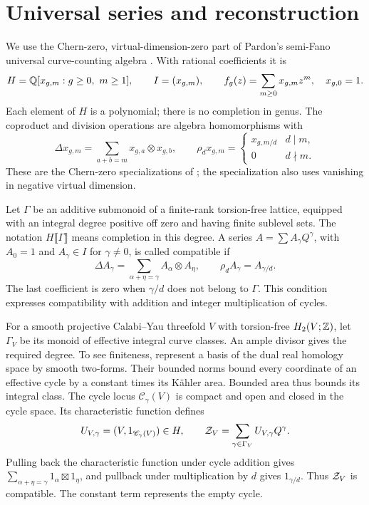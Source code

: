 \section{Universal series and reconstruction}\label{sec:universal}

We use the Chern-zero, virtual-dimension-zero part of Pardon's
semi-Fano universal curve-counting algebra \cite[Theorem 1.2]{Pardon}.
With rational coefficients it is
\[
 H=\mathbb Q[x_{g,m}:g\ge0,\ m\ge1],\qquad
 I=(x_{g,m}),\qquad f_g(z)=\sum_{m\ge0}x_{g,m}z^m,
 \quad x_{g,0}=1.
\]
Each element of $H$ is a polynomial; there is no completion in genus.
The coproduct and division operations are algebra homomorphisms with
\begin{equation}\label{eq:operations}
 \Delta x_{g,m}=\sum_{a+b=m}x_{g,a}\otimes x_{g,b},\qquad
 \rho_d x_{g,m}=\begin{cases}x_{g,m/d}&d\mid m,\\0&d\nmid m.
 \end{cases}
\end{equation}
These are the Chern-zero specializations of
\cite[Definitions 3.9, 3.12, Lemmas 4.12--4.13 and Theorem 7.6]{Pardon};
the specialization also uses vanishing in negative virtual dimension.

Let $\Gamma$ be an additive submonoid of a finite-rank torsion-free
lattice, equipped with an integral degree positive off zero and having
finite sublevel sets. The notation $H\llbracket\Gamma\rrbracket$ means
completion in this degree. A series $A=\sum A_\gamma Q^\gamma$, with
$A_0=1$ and $A_\gamma\in I$ for $\gamma\ne0$, is called compatible if
\begin{equation}\label{eq:compatible}
 \Delta A_\gamma=\sum_{\alpha+\eta=\gamma}A_\alpha\otimes A_\eta,
 \qquad \rho_d A_\gamma=A_{\gamma/d}.
\end{equation}
The last coefficient is zero when $\gamma/d$ does not belong to
$\Gamma$. This condition expresses compatibility with addition and
integer multiplication of cycles.

For a smooth projective Calabi--Yau threefold $V$ with torsion-free
$H_2(V;\mathbb Z)$, let $\Gamma_V$ be its monoid of effective integral curve
classes. An ample divisor gives the required degree. To see finiteness,
represent a basis of the dual real homology space by smooth two-forms.
Their bounded norms bound every coordinate of an effective cycle by a
constant times its K\"ahler area. Bounded area thus bounds its integral
class. The cycle locus $\mathscr C_\gamma(V)$ is compact and open and
closed in the cycle space. Its characteristic function defines
\[
 U_{V,\gamma}=(V,1_{\mathscr C_\gamma(V)})\in H,
 \qquad \mathcal Z_V=\sum_{\gamma\in\Gamma_V}U_{V,\gamma}Q^\gamma.
\]
Pulling back the characteristic function under cycle addition gives
$\sum_{\alpha+\eta=\gamma}1_\alpha\boxtimes1_\eta$, and pullback under
multiplication by $d$ gives $1_{\gamma/d}$. Thus $\mathcal Z_V$ is compatible.
The constant term represents the empty cycle.

